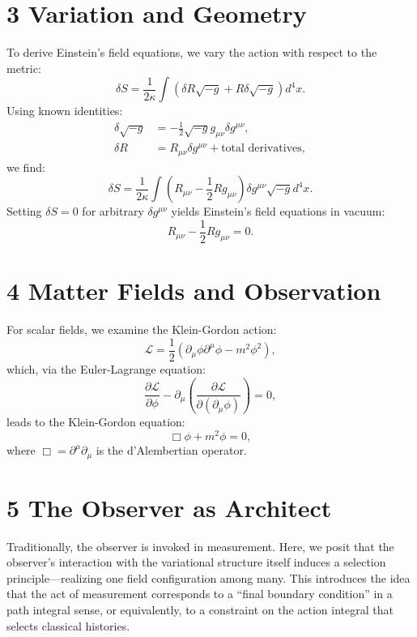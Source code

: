 \documentclass{report}
\begin{document}
\section*{3 Variation and Geometry}
To derive Einstein’s field equations, we vary the action with respect to the metric:
\begin{equation}
\delta S = \frac{1}{2\kappa} \int \left(\delta R\sqrt{-g} + R\delta\sqrt{-g}\right) d^4x. 
\end{equation}
Using known identities:
\begin{align}
\delta\sqrt{-g} &= -\frac{1}{2}\sqrt{-g}g_{\mu\nu}\delta g^{\mu\nu}, \\
\delta R &= R_{\mu\nu}\delta g^{\mu\nu} + \text{total derivatives},
\end{align}
we find:
\begin{equation}
\delta S = \frac{1}{2\kappa} \int \left(R_{\mu\nu} - \frac{1}{2}Rg_{\mu\nu}\right) \delta g^{\mu\nu}\sqrt{-g}d^4x. 
\end{equation}
Setting $\delta S = 0$ for arbitrary $\delta g^{\mu\nu}$ yields Einstein’s field equations in vacuum:
\begin{equation}
R_{\mu\nu} - \frac{1}{2}Rg_{\mu\nu} = 0. 
\end{equation}

\section*{4 Matter Fields and Observation}
For scalar fields, we examine the Klein-Gordon action:
\begin{equation}
\mathcal{L} = \frac{1}{2}\left(\partial_{\mu}\phi\partial^{\mu}\phi - m^2\phi^2\right),
\end{equation}
which, via the Euler-Lagrange equation:
\begin{equation}
\frac{\partial\mathcal{L}}{\partial\phi} - \partial_{\mu}\left(\frac{\partial\mathcal{L}}{\partial(\partial_{\mu}\phi)}\right) = 0, 
\end{equation}
leads to the Klein-Gordon equation:
\begin{equation}
\Box\phi + m^2\phi = 0, 
\end{equation}
where $\Box = \partial^{\mu}\partial_{\mu}$ is the d’Alembertian operator.

\section*{5 The Observer as Architect}
Traditionally, the observer is invoked in measurement. Here, we posit that the observer’s interaction with the variational structure itself induces a selection principle—realizing one field
configuration among many. This introduces the idea that the act of measurement corresponds
to a “final boundary condition” in a path integral sense, or equivalently, to a constraint on the
action integral that selects classical histories.
\end{document}
